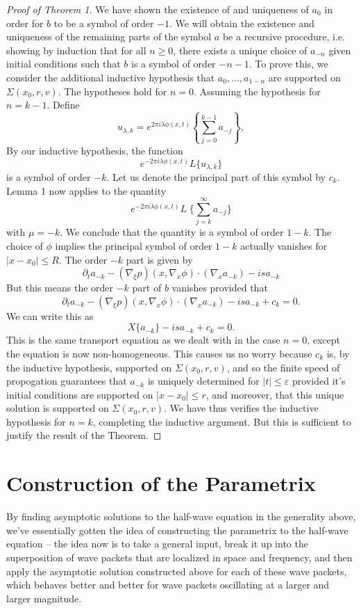 \documentclass{article}
\theoremstyle{plain}
\theoremstyle{remark}
\theoremstyle{definition}
\begin{document}
\begin{proof}[Proof of Theorem 1]
We have shown the existence of and uniqueness of $a_0$ in order for $b$ to be a symbol of order $-1$. We will obtain the existence and uniqueness of the remaining parts of the symbol $a$ be a recursive procedure, i.e. showing by induction that for all $n \geq 0$, there exists a unique choice of $a_{-n}$ given initial conditions such that $b$ is a symbol of order $-n-1$. To prove this, we consider the additional inductive hypothesis that $a_0, \dots, a_{1-n}$ are supported on $\Sigma(x_0,r,v)$. The hypotheses hold for $n = 0$. Assuming the hypothesis for $n = k-1$. Define
%
\[ u_{\lambda,k} = e^{2 \pi i \lambda \phi(x,t)} \left\{ \sum_{j = 0}^{k-1} a_{-j} \right\}, \]
%
By our inductive hypothesis, the function
%
\[ e^{-2 \pi i \lambda \phi(x,t)} L \{ u_{\lambda,k} \} \]
%
is a symbol of order $-k$. Let us denote the principal part of this symbol by $c_k$. Lemma 1 now applies to the quantity
%
\[ e^{-2 \pi i \lambda \phi(x,t)} L\; \Big\{ \sum_{j = k}^\infty a_{-j} \Big\} \]
%
with $\mu = -k$. We conclude that the quantity is a symbol of order $1 - k$. The choice of $\phi$ implies the principal symbol of order $1-k$ actually vanishes for $|x - x_0| \leq R$. The order $-k$ part is given by
%
\[ \partial_t a_{-k} - (\nabla_\xi p)(x, \nabla_x \phi) \cdot (\nabla_x a_{-k}) - i s a_{-k} \]
%
But this means the order $-k$ part of $b$ vanishes provided that
%
\[ \partial_t a_{-k} - (\nabla_\xi p)(x, \nabla_x \phi) \cdot (\nabla_x a_{-k}) - i s a_{-k} + c_k = 0. \]
%
We can write this as
%
\[ X \{ a_{-k} \} - i s a_{-k} + c_k = 0. \]
%
This is the same transport equation as we dealt with in the case $n = 0$, except the equation is now non-homogeneous. This causes us no worry because $c_k$ is, by the inductive hypothesis, supported on $\Sigma(x_0,r,v)$, and so the finite speed of propogation guarantees that $a_{-k}$ is uniquely determined for $|t| \leq \varepsilon$ provided it's initial conditions are supported on $|x -  x_0| \leq r$, and moreover, that this unique solution is supported on $\Sigma(x_0,r,v)$. We have thus verifies the inductive hypothesis for $n = k$, completing the inductive argument. But this is sufficient to justify the result of the Theorem. \qedhere

\end{proof}

\section{Construction of the Parametrix}

By finding asymptotic solutions to the half-wave equation in the generality above, we've essentially gotten the idea of constructing the parametrix to the half-wave equation -- the idea now is to take a general input, break it up into the superposition of wave packets that are localized in space and frequency, and then apply the asymptotic solution constructed above for each of these wave packets, which behaves better and better for wave packets oscillating at a larger and larger magnitude.
\end{document}
